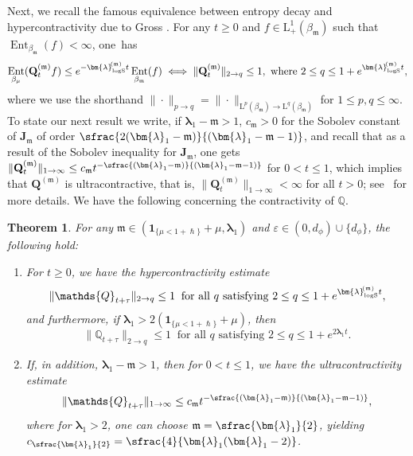 \documentclass[JEP,XML,SOM,Unicode]{cedram}
\let\epsilon\varepsilon
\newcommand{\pspfrac}[2]{\sfrac{(#1)}{(#2)}}
\theoremstyle{plain}
\newtheorem{theorem}{Theorem}[section]
\theoremstyle{definition}
\DeclareMathOperator{\Ent}{Ent}
\newcommand{\J}{\mathds{Q}}
\newcommand{\Leb}{\mathrm{L}}
\newcommand{\calJd}{\mathbf{J}}
\newcommand{\m}{\mathfrak{m}}
\newcommand{\lam}{{\bm{\lambda}_1}}
\newcommand{\logSob}[1][\mo]{\bm{\lambda}_{\mathrm{logS}}^{\hspace{-0.06cm}(#1)}}
\newcommand{\Q}[1][\mo]{\mathbf{Q}^{({#1})}}
\newcommand{\gab}[1][\lam,\mo]{{\beta_{#1}}}
\let\h\hslash
\let\mo\mu
\begin{document}
Next, we recall the famous equivalence between entropy decay and hypercontracti\-vity due to Gross \cite{Gross}. For any $t\!\geq\!0$ and $f\!\in\!\Leb^1_+(\gab[\m])$ such that $\Ent_{\gab[\m]}(f)\!<\!\infty$, one~has
\begin{equation*}
\Ent_{\gab[\mo]} (\Q[\m]_tf) \leq e^{- \logSob[\m] t} \Ent_{\gab[\m]} (f) \iff \|\Q[\m]_t \|_{2 \to q} \leq 1, \textrm{ where } 2\leq q \leq 1+e^{ \logSob[\m] t},
\end{equation*}
where we use the shorthand $\|{\cdot}\|_{p \to q} = \|{\cdot}\|_{\Leb^p(\gab[\m]) \to \Leb^q(\gab[\m])}$ for $1 \leq p, q \leq \infty$. To state our next result we write, if $\lam - \m > 1$, $c_{\m} > 0$ for the Sobolev constant of $\calJd_\m$ of order $\sfrac{2(\lam-\m)}{(\lam-\m-1)}$, and recall that as a result of the Sobolev inequality for $\calJd_\m$, one gets $\|\Q[\m]_t\|_{1 \to \infty} \leq c_{\m} t^{-\pspfrac{\lam-\m}{\lam-\m-1}}$ for $0 < t \leq 1$, which implies that $\Q[\m]$ is ultracontractive,
that is, $\|\Q[\m]_t\|_{1 \to \infty} < \infty$ for all $t > 0$; see~ for more details. We have the following concerning the contractivity of $\J$.

\begin{theorem}
\label{thm:contractivity}
For any $\m \in (\bm{1}_{\{\mo < 1+\h\}} + \mo , \lam)$ and $\epsilon \in (0,d_\phi) \cup \{d_\phi\}$, the following hold:
\begin{enumerate}
\item \label{item-1:thm:contractivity} For $t \geq 0$, we have the hypercontractivity estimate
\begin{equation*}
\|\J_{t+\tau}\|_{2 \to q} \leq 1 \: \text{ for all } q \text{ satisfying } 2\leq q \leq 1+e^{ \logSob[\m] t},
\end{equation*}
and furthermore, if $\lam > 2(\bm{1}_{\{\mo < 1+\h \}} + \mo)$, then
\begin{equation*}
\|\J_{t+\tau}\|_{2 \to q} \leq 1 \: \text{ for all } q \text{ satisfying }2\leq q \leq 1+e^{2\lam t}.
\end{equation*}
\item \label{item-2:thm:contractivity} If, in addition, $\lam-\m > 1$, then for $0 < t \leq 1$, we have the ultracontractivity estimate
\begin{equation*}
\|\J_{t+\tau}\|_{1 \to \infty} \leq c_{\m} t^{-\pspfrac{\lam-\m}{\lam-\m-1}},
\end{equation*}
where for $\lam> 2$, one can choose $\m=\sfrac{\lam}{2}$, yielding $c_{\sfrac{\lam}{2}}=\sfrac{4}{\lam(\lam- 2)}$.
\end{enumerate}
\end{theorem}
\end{document}
